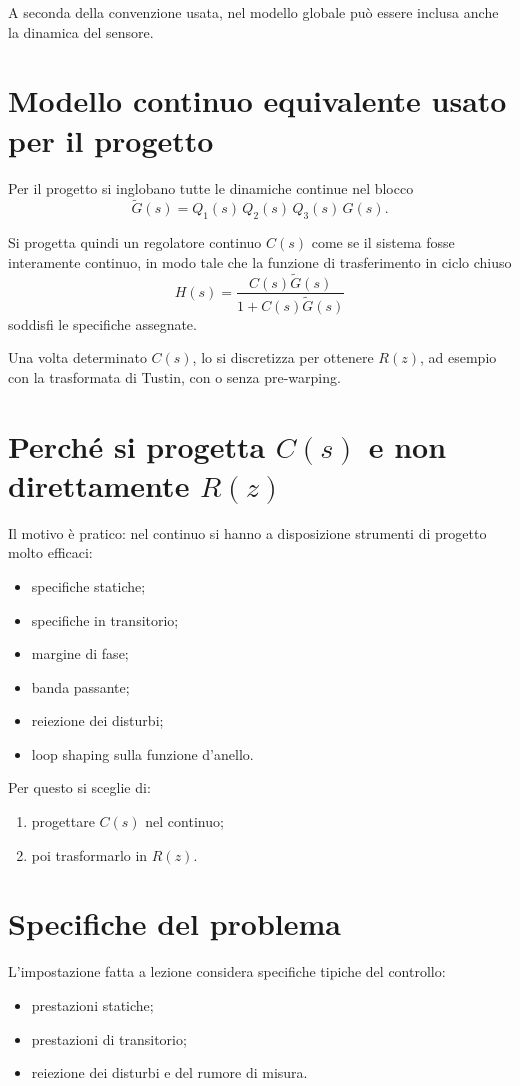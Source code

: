 A seconda della convenzione usata, nel modello globale pu\`o essere inclusa anche la dinamica del sensore.

\section{Modello continuo equivalente usato per il progetto}

Per il progetto si inglobano tutte le dinamiche continue nel blocco
\[
\tilde G(s)=Q_1(s)\,Q_2(s)\,Q_3(s)\,G(s).
\]

Si progetta quindi un regolatore continuo \(C(s)\) come se il sistema fosse interamente continuo,
in modo tale che la funzione di trasferimento in ciclo chiuso
\[
H(s)=\frac{C(s)\tilde G(s)}{1+C(s)\tilde G(s)}
\]
soddisfi le specifiche assegnate.

Una volta determinato \(C(s)\), lo si discretizza per ottenere \(R(z)\),
ad esempio con la trasformata di Tustin, con o senza pre-warping.

\section{Perch\'e si progetta \(C(s)\) e non direttamente \(R(z)\)}

Il motivo \`e pratico:
nel continuo si hanno a disposizione strumenti di progetto molto efficaci:
\begin{itemize}
    \item specifiche statiche;
    \item specifiche in transitorio;
    \item margine di fase;
    \item banda passante;
    \item reiezione dei disturbi;
    \item loop shaping sulla funzione d'anello.
\end{itemize}

Per questo si sceglie di:
\begin{enumerate}
    \item progettare \(C(s)\) nel continuo;
    \item poi trasformarlo in \(R(z)\).
\end{enumerate}

\section{Specifiche del problema}

L'impostazione fatta a lezione considera specifiche tipiche del controllo:
\begin{itemize}
    \item prestazioni statiche;
    \item prestazioni di transitorio;
    \item reiezione dei disturbi e del rumore di misura.
\end{itemize}

